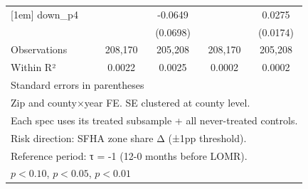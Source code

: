 \begin{table}[htbp]
\begin{tabular}{l*{4}{c}}
[1em]
down\_p4             &                     &     -0.0649         &                     &      0.0275         \\
                    &                     &    (0.0698)         &                     &    (0.0174)         \\
\hline
Observations        &     208,170         &     205,208         &     208,170         &     205,208         \\
Within R²           &      0.0022         &      0.0025         &      0.0002         &      0.0002         \\
\hline\hline
\multicolumn{5}{l}{\footnotesize Standard errors in parentheses}\\
\multicolumn{5}{l}{\footnotesize Zip and county×year FE. SE clustered at county level.}\\
\multicolumn{5}{l}{\footnotesize Each spec uses its treated subsample + all never-treated controls.}\\
\multicolumn{5}{l}{\footnotesize Risk direction: SFHA zone share Δ (±1pp threshold).}\\
\multicolumn{5}{l}{\footnotesize Reference period: τ = -1 (12-0 months before LOMR).}\\
\multicolumn{5}{l}{\footnotesize \sym{*} \(p<0.10\), \sym{**} \(p<0.05\), \sym{***} \(p<0.01\)}\\
\end{tabular}
\end{table}
